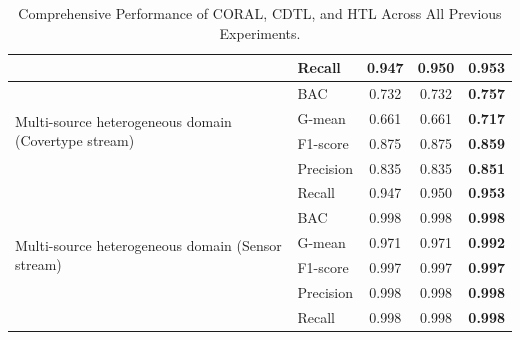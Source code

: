 \begin{table}[h]
{\begin{tabular}{|l|l|c|c|c|}
                                                 & Recall          & 0.947          & 0.950         & \textbf{0.953} \\ \hline
  \multirow{4}{*}{Multi-source heterogeneous domain (Covertype stream)} & BAC & 0.732  & 0.732         & \textbf{0.757} \\ \cline{2-5} 
                                                 & G-mean          & 0.661          & 0.661         & \textbf{0.717} \\ \cline{2-5} 
                                                 & F1-score        & 0.875          & 0.875         & \textbf{0.859} \\ \cline{2-5} 
                                                 & Precision       & 0.835          & 0.835         & \textbf{0.851} \\ \cline{2-5} 
                                                 & Recall          & 0.947          & 0.950         & \textbf{0.953} \\ \hline
  \multirow{4}{*}{Multi-source heterogeneous domain (Sensor stream)} & BAC & 0.998  & 0.998         & \textbf{0.998} \\ \cline{2-5} 
                                                 & G-mean          & 0.971          & 0.971         & \textbf{0.992} \\ \cline{2-5} 
                                                 & F1-score        & 0.997          & 0.997         & \textbf{0.997} \\ \cline{2-5} 
                                                 & Precision       & 0.998          & 0.998         & \textbf{0.998} \\ \cline{2-5} 
                                                 & Recall          & 0.998          & 0.998         & \textbf{0.998} \\ \hline
  \end{tabular}
  }
  \caption{Comprehensive Performance of CORAL, CDTL, and HTL Across All Previous Experiments.}

  \label{table:6_table2}
  \end{table}

